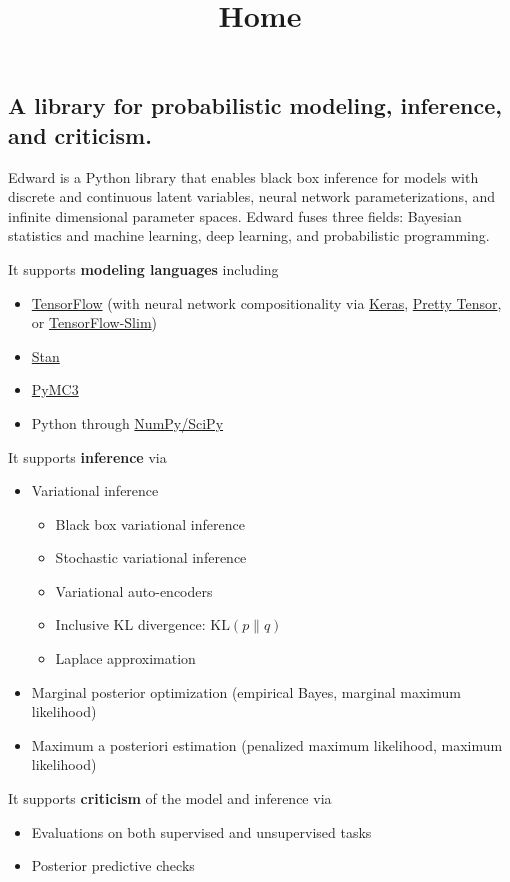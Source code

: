 \title{Home}

\subsection{A library for probabilistic modeling, inference, and criticism.}
Edward is a Python library that enables black box inference for models with
discrete and continuous latent variables, neural network parameterizations, and
infinite dimensional parameter spaces. Edward fuses three fields: Bayesian
statistics and machine learning, deep learning, and probabilistic programming.

It supports \textbf{modeling languages} including
\begin{itemize}
\item \href{https://www.tensorflow.org}{TensorFlow} (with neural network
  compositionality via \href{http://keras.io}{Keras},
  \href{https://github.com/google/prettytensor}{Pretty Tensor}, or
  \href{https://github.com/tensorflow/models/blob/master/inception/inception/slim/README.md}{TensorFlow-Slim})
\item \href{http://mc-stan.org}{Stan}
\item \href{http://pymc-devs.github.io/pymc3/}{PyMC3}
\item Python through \href{http://scipy.org/}{NumPy/SciPy}
\end{itemize}

It supports \textbf{inference} via
\begin{itemize}
\item Variational inference
\begin{itemize}
    \item Black box variational inference
    \item Stochastic variational inference
    \item Variational auto-encoders
    \item Inclusive KL divergence: $\text{KL}(p\|q)$
    \item Laplace approximation
  \end{itemize}
\item Marginal posterior optimization (empirical Bayes, marginal maximum
likelihood)
\item Maximum a posteriori estimation (penalized maximum likelihood, maximum
  likelihood)
\end{itemize}

It supports \textbf{criticism} of the model and inference via
\begin{itemize}
\item Evaluations on both supervised and unsupervised tasks
\item Posterior predictive checks
\end{itemize}

